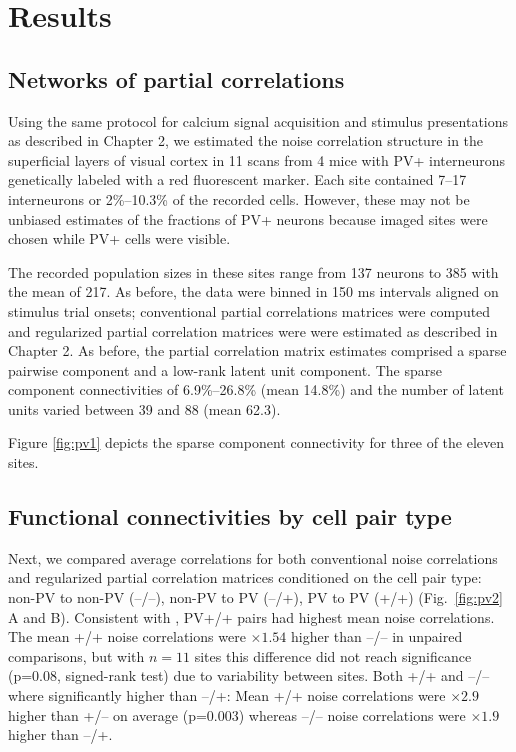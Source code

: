 \section{Results}
\subsection{Networks of partial correlations}
Using the same protocol for calcium signal acquisition  and stimulus presentations as described in Chapter 2, we estimated the noise correlation structure in the superficial layers of visual cortex in 11 scans from 4 mice with PV+ interneurons genetically labeled with a red fluorescent marker.
Each site contained 7--17 interneurons or 2\%--10.3\% of the recorded cells.  
However, these may not be unbiased estimates of the fractions of PV+ neurons because imaged sites were chosen while PV+ cells were  visible.

The recorded population sizes in these sites range from 137 neurons to 385 with the mean of 217. 
As before, the data were binned in 150 ms intervals aligned on stimulus trial onsets; conventional partial correlations matrices were computed and regularized partial correlation matrices were were estimated as described in Chapter 2.
As before, the partial correlation matrix estimates comprised a sparse pairwise component and a low-rank latent unit component.
The sparse component connectivities of 6.9\%--26.8\% (mean 14.8\%) and the number of latent units varied between 39 and 88 (mean 62.3).

Figure \ref{fig:pv1} depicts the sparse component connectivity for three of the eleven sites. 




\subsection{Functional connectivities by cell pair type}


Next, we compared average correlations for both conventional noise correlations and regularized partial correlation matrices conditioned on the cell pair type: 
non-PV to non-PV (--/--), non-PV to PV (--/+), PV to PV (+/+)  (Fig.~\ref{fig:pv2} A and B).
Consistent with \cite{Hofer:2011}, PV+/+ pairs had highest mean noise correlations. The mean +/+ noise correlations were $\times 1.54$ higher than --/-- in unpaired comparisons, but with $n=11$ sites this difference did not reach significance (p=0.08, signed-rank test) due to variability between sites. Both +/+ and --/-- where significantly higher than --/+: Mean +/+ noise correlations were $\times 2.9$ higher than +/-- on average (p=0.003) whereas --/-- noise correlations were $\times 1.9$ higher than --/+.

